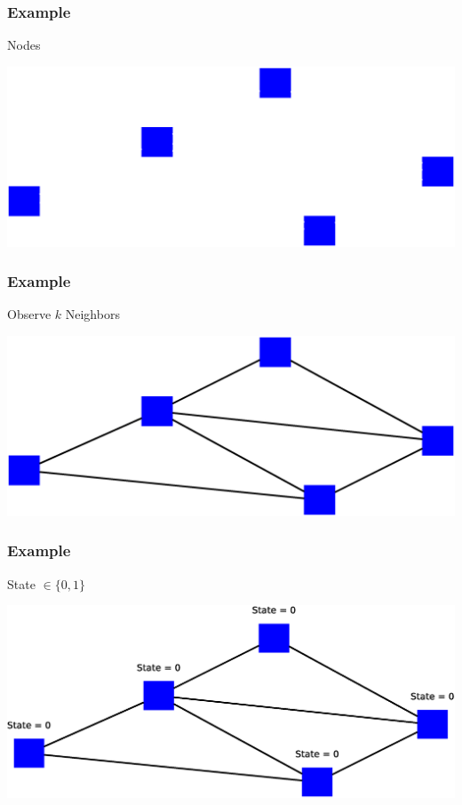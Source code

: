 \begin{frame}
    \frametitle{Example}
    \begin{itemize}
        \gitem Nodes
    \end{itemize}
    \vspace{10.8pt}
    \includegraphics[width=\textwidth]{img/model1}
    \vfill
\end{frame}

\begin{frame}
    \frametitle{Example}
    \begin{itemize}
        \gitem Observe $k$ Neighbors
    \end{itemize}
    \vspace{8.6pt}
    \includegraphics[width=\textwidth]{img/model2}
    \vfill
\end{frame}

\begin{frame}
    \frametitle{Example}
    \begin{itemize}
        \gitem State $\in \lbrace 0, 1 \rbrace$
    \end{itemize}
    \vspace{8pt}
    \includegraphics[width=\textwidth]{img/model3}
    \vfill
\end{frame}

